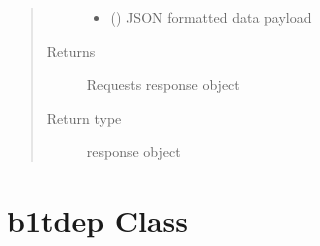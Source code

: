 \documentclass[letterpaper,10pt,english]{sphinxmanual}
\begin{document}
\begin{fulllineitems}
\begin{fulllineitems}
\begin{quote}
\begin{description}
\begin{itemize}
\item {} 
\sphinxAtStartPar
{} () \textendash{} JSON formatted data payload

\end{itemize}

\item[{Returns}] \leavevmode
\sphinxAtStartPar
Requests response object

\item[{Return type}] \leavevmode
\sphinxAtStartPar
response object

\end{description}\end{quote}

\end{fulllineitems}


\end{fulllineitems}



\section{b1tdep Class}
\label{\detokenize{b1tdep-class:b1tdep-class}}\label{\detokenize{b1tdep-class::doc}}
\end{document}

